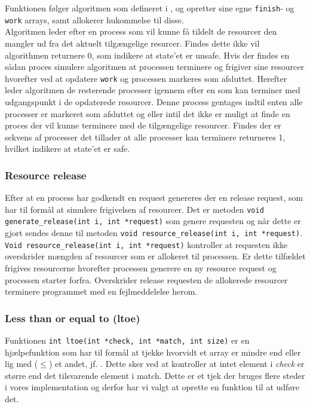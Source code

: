 \documentclass[main.tex]{subfile}
\begin{document}
Funktionen følger algoritmen som defineret i \cite{SA:2013}, og opretter sine egne \texttt{finish}- og \texttt{work} arrays, samt allokerer hukommelse til disse.\\

Algoritmen leder efter en process som vil kunne få tildelt de resourcer den mangler ud fra det aktuelt tilgængelige resurcer. Findes dette ikke vil algorithmen returnere 0, som indikere at state'et er unsafe. Hvis der findes en sådan proces simulere algoritmen at processen terminere og frigiver sine resourcer hvorefter ved at opdatere \texttt{work} og processen markeres som afsluttet. Herefter leder algoritmen de resterende processer igennem efter en som kan terminer med udgangspunkt i de opdaterede resourcer. Denne process gentages indtil enten alle processer er markeret som afsluttet og eller intil det ikke er muligt at finde en proces der vil kunne terminere med de tilgængelige resourcer. Findes der er sekvens af processer det tillader at alle processer kan terminere returneres 1, hvilket indikere at state'et er safe.

\subsubsection{Resource release}
Efter at en process har godkendt en request genereres der en release request, som har til formål at simulere frigivelsen af resourcer. Det er metoden \texttt{void generate\_release(int i, int *request)} som genere requesten og når dette er gjort sendes denne til metoden \texttt{void resource\_release(int i, int *request)}.\\

\texttt{Void resource\_release(int i, int *request)} kontroller at requesten ikke overskrider mængden af resourcer som er allokeret til processen. Er dette tilfældet frigives resourcerne hvorefter processen generere en ny resource request og processen starter forfra. Overskrider release requesten de allokerede resourcer terminere programmet med en fejlmeddelelse herom.\\

\subsubsection{Less than or equal to (ltoe)}
Funktionen \texttt{int ltoe(int *check, int *match, int size)} er en hjælpefunktion som har til formål at tjekke hvorvidt et array er mindre end eller lig med ($\leq$) et andet, jf. \cite[s. 327]{SA:2013}. Dette sker ved at kontroller at intet element i \emph{check} er større end det tilsvarende element i match. Dette er et tjek der bruges flere steder i vores implementation og derfor har vi valgt at oprette en funktion til at udføre det.
\end{document}
